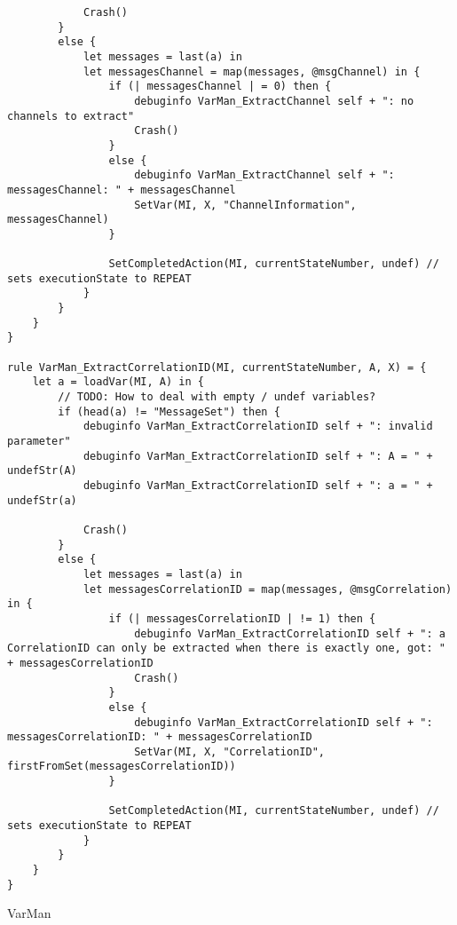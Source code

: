\begin{listing}[H]
\begin{verbatim}
            Crash()
        }
        else {
            let messages = last(a) in
            let messagesChannel = map(messages, @msgChannel) in {
                if (| messagesChannel | = 0) then {
                    debuginfo VarMan_ExtractChannel self + ": no channels to extract"
                    Crash()
                }
                else {
                    debuginfo VarMan_ExtractChannel self + ": messagesChannel: " + messagesChannel
                    SetVar(MI, X, "ChannelInformation", messagesChannel)
                }

                SetCompletedAction(MI, currentStateNumber, undef) // sets executionState to REPEAT
            }
        }
    }
}

rule VarMan_ExtractCorrelationID(MI, currentStateNumber, A, X) = {
    let a = loadVar(MI, A) in {
        // TODO: How to deal with empty / undef variables?
        if (head(a) != "MessageSet") then {
            debuginfo VarMan_ExtractCorrelationID self + ": invalid parameter"
            debuginfo VarMan_ExtractCorrelationID self + ": A = " + undefStr(A)
            debuginfo VarMan_ExtractCorrelationID self + ": a = " + undefStr(a)

            Crash()
        }
        else {
            let messages = last(a) in
            let messagesCorrelationID = map(messages, @msgCorrelation) in {
                if (| messagesCorrelationID | != 1) then {
                    debuginfo VarMan_ExtractCorrelationID self + ": a CorrelationID can only be extracted when there is exactly one, got: " + messagesCorrelationID
                    Crash()
                }
                else {
                    debuginfo VarMan_ExtractCorrelationID self + ": messagesCorrelationID: " + messagesCorrelationID
                    SetVar(MI, X, "CorrelationID", firstFromSet(messagesCorrelationID))
                }

                SetCompletedAction(MI, currentStateNumber, undef) // sets executionState to REPEAT
            }
        }
    }
}
\end{verbatim}
\caption{VarMan}
\label{lst:asm:VarMan}
\end{listing}





